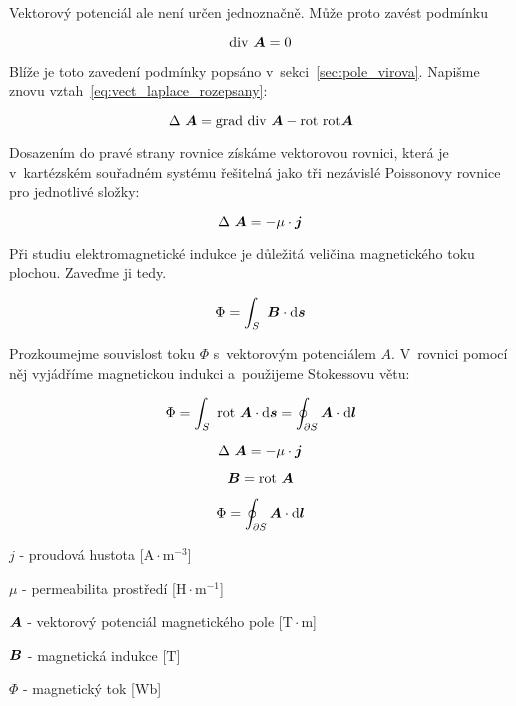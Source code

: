 Vektorový potenciál ale není určen jednoznačně. Může proto zavést podmínku 

\begin{equation}
\mathrm{div} \ \boldsymbol{A} = 0
\end{equation}

Blíže je toto zavedení podmínky popsáno v~sekci~\ref{sec:pole_virova}. Napišme znovu vztah~\eqref{eq:vect_laplace_rozepsany}:

\begin{equation}
\Delta \ \vect{A} = \grad \ \diverg \ \vect{A} - \rot \ \rot \vect{A} 
\end{equation}

Dosazením do pravé strany rovnice získáme vektorovou rovnici, která je v~kartézském souřadném systému řešitelná jako tři nezávislé Poissonovy rovnice pro jednotlivé složky:

\begin{equation}
\Delta \ \boldsymbol{A} = -\mu \cdot \boldsymbol{j}
\end{equation}

Při studiu elektromagnetické indukce je důležitá veličina magnetického toku plochou. Zaveďme ji tedy.

\begin{equation}
\Phi = \int_S \ \boldsymbol{B} \cdot \mathrm{d}\boldsymbol{s}
\end{equation}

Prozkoumejme souvislost toku \(\Phi\) s~vektorovým potenciálem \(A\). V~rovnici pomocí něj vyjádříme magnetickou indukci a~použijeme Stokessovu větu:

\begin{equation}
\Phi = \int_S \ \mathrm{rot} \ \boldsymbol{A} \cdot \mathrm{d}\boldsymbol{s} = \oint_{\partial S} \boldsymbol{A} \cdot \mathrm{d}\boldsymbol{l}
\end{equation}

\begin{fact}
\begin{equation}
\Delta \ \boldsymbol{A} = -\mu \cdot \boldsymbol{j}
\end{equation}

\begin{equation}
\boldsymbol{B} = \mathrm{rot} \ \boldsymbol{A}
\end{equation}

\begin{equation}
\Phi = \oint_{\partial S} \boldsymbol{A} \cdot \mathrm{d}\boldsymbol{l}
\end{equation}

\(j\) - proudová hustota [\(\mathrm{A} \cdot \mathrm{m}^{-3}\)]

\(\mu\) - permeabilita prostředí [\(\mathrm{H} \cdot \mathrm{m}^{-1}\)]

\(\boldsymbol{A}\) - vektorový potenciál magnetického pole [\(\mathrm{T} \cdot \mathrm{m}\)]

\(\boldsymbol{B}\) - magnetická indukce [\(\mathrm{T}\)]

\(\Phi\) - magnetický tok [\(\mathrm{Wb}\)]
\end{fact}

